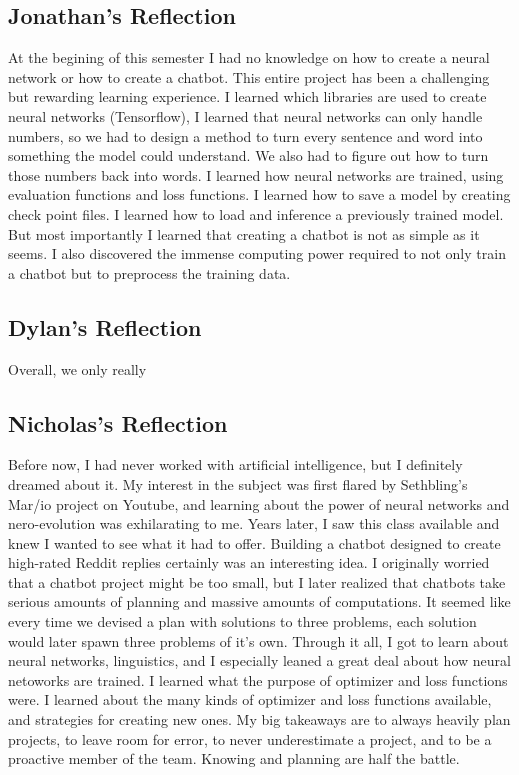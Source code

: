 \documentclass[11pt,twocolumn]{article}
\begin{document}
\subsection*{Jonathan's Reflection}
At the begining of this semester I had no knowledge on how to create a neural network or how to create a chatbot.  This entire project has been a challenging but rewarding learning experience.  I learned which libraries are used to create neural networks (Tensorflow), I learned that neural networks can only handle numbers, so we had to design a method to turn every sentence and word into something the model could understand.  We also had to figure out how to turn those numbers back into words.  I learned how neural networks are trained, using evaluation functions and loss functions.  I learned how to save a model by creating check point files.  I learned how to load and inference a previously trained model.  But most importantly I learned that creating a chatbot is not as simple as it seems.  I also discovered the immense computing power required to not only train a chatbot but to preprocess the training data.
\subsection*{Dylan's Reflection}
Overall, we only really 
\subsection*{Nicholas's Reflection}
Before now, I had never worked with artificial intelligence, but I definitely dreamed about it.  My interest in the subject was first flared by Sethbling's Mar/io project on Youtube, and learning about the power of neural networks and nero-evolution was exhilarating to me.  Years later, I saw this class available and knew I wanted to see what it had to offer.  Building a chatbot designed to create high-rated Reddit replies certainly was an interesting idea.  I originally worried that a chatbot project might be too small, but I later realized that chatbots take serious amounts of planning and massive amounts of computations.  It seemed like every time we devised a plan with solutions to three problems, each solution would later spawn three problems of it's own.  Through it all, I got to learn about neural networks, linguistics, and I especially leaned a great deal about how neural netoworks are trained.  I learned what the purpose of optimizer and loss functions were.  I learned about the many kinds of optimizer and loss functions available, and strategies for creating new ones.  My big takeaways are to always heavily plan projects, to leave room for error, to never underestimate a project, and to be a proactive member of the team.  Knowing and planning are half the battle.
\end{document}
